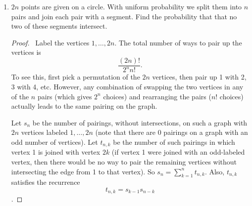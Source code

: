 \documentclass[12pt]{article}
\begin{document}
\begin{enumerate}[leftmargin=0cm,itemindent=.5cm,labelwidth=\itemindent,labelsep=0cm,align=left]
\begin{comment}
\begin{proof}
\ We can actually show this inductively without using linear algebra.  It is clear that this bound holds for $n = 1$, since the edges of $K_1$ can be partitioned into $0$ sets that are vacuously the edge sets of a complete bipartite subgraph.

For $n > 1$, suppose the bound holds for all $k < n$, so that if the edges of $K_k$ are partitioned into $m$ sets, each of which forms the edge set of a complete bipartite subgraph, then $m \geq k-1$.  If we are to partition the edges of $K_n$ into such subsets, then one will be the edge set of some complete bipartite subgraph $K_{r,s}$, where $r + s \leq n$, $0 < r,s < n$, and $R$ and $S$ are the two disjoint sets of vertices that make up the graph.

The only edges that have been used are those that go between $R$ and $S$.  Thus, the set of edges that remain is the disjoint union of the edgesets of the complete graphs on $K_n \setminus R$ and on $K_n \setminus S$, which are isomorphic to $K_{n-r}$ and $K_{n-s}$.  So the way to minimize $m$, once having fixed a choice of $R$ and $S$, is to minimize $m_{n-r}$ and $m_{n-s}$, which are the number of sets we partition the eges of $K_n \setminus R$ and $K_n \setminus S$ into.  By the inductive hypothesis, we know that $m_{n-r} \geq n-r-1$ and $m_{n-s} \geq n-s-1$.  Therefore,
$$
m = 1 + m_{n-r} + m_{n-s} \geq 1 + (n-r-1) + (n-s-1) = n + (n-r-s) - 1 \geq n-1
$$
since $n - r - s \geq 0$.
\end{proof}
\end{comment}


\item $2n$ points are given on a circle. With uniform probability we split them into $n$ pairs
and join each pair with a segment. Find the probability that that no two of these
segments intersect.

\begin{proof}
\ Label the vertices $1, \dots , 2n$.  The total number of ways to pair up the vertices is $$\frac{(2n)!}{2^n n!}.$$  To see this, first pick a permutation of the $2n$ vertices, then pair up 1 with 2, 3 with 4, etc.  However, any combination of swapping the two vertices in any of the $n$ pairs (which gives $2^n$ choices) and rearranging the pairs ($n!$ choices) actually leads to the same pairing on the graph.

Let $s_n$ be the number of pairings, without intersections, on such a graph with $2n$ vertices labeled $1, \dots , 2n$ (note that there are $0$ pairings on a graph with an odd number of vertices).  Let $t_{n,k}$ be the number of such pairings in which vertex 1 is joined with vertex $2k$ (if vertex 1 were joined with an odd-labeled vertex, then there would be no way to pair the remaining vertices without intersecting the edge from 1 to that vertex).  So $s_n = \sum_{k=1}^{n} t_{n,k}$.  Also, $t_{n,k}$ satisfies the recurrence
$$
t_{n,k} = s_{k-1} s_{n-k}
$$.


\end{proof}
\end{enumerate}
\end{document}
